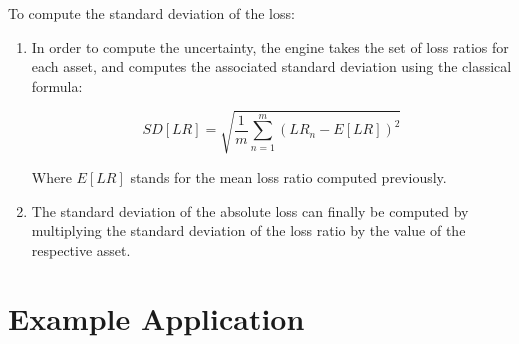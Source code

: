 To compute the standard deviation of the loss:

\begin{enumerate}

\item In order to compute the uncertainty, the engine takes the set of loss ratios for each asset, and computes the associated standard deviation using the classical formula:

\begin{equation}
SD[LR]=\sqrt{  \frac{1}{m}\sum_{n=1}^m{(LR_n-E[LR])^2} }
\end{equation}

Where $E[LR]$ stands for the mean loss ratio computed previously.

\item The standard deviation of the absolute loss can finally be computed by multiplying the standard deviation of the loss ratio by the value of the respective asset.

\end{enumerate}

\section{Example Application}
